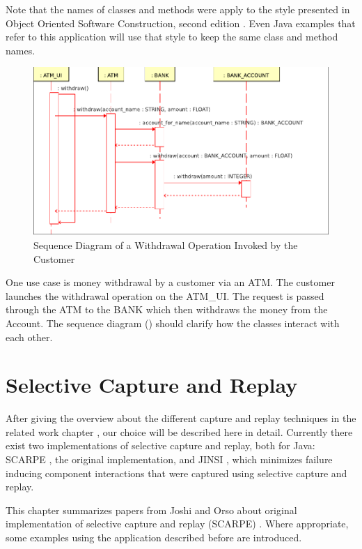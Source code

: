 Note that the names of classes and methods were apply to the style presented in Object Oriented Software Construction, second edition \cite{oosc2}. Even Java examples that refer to this application will use that style to keep the same class and method names.

\begin{figure}[ht]
   \centering
   \includegraphics[width=1\textwidth]{illustrations/example_withdrawal}
   \caption{Sequence Diagram of a Withdrawal Operation Invoked by the Customer}
   \label{fig:example_withdraw_sequence}
\end{figure}

One use case is money withdrawal by a customer via an ATM. The customer launches the withdrawal operation on the ATM\_UI. The request is passed through the ATM to the BANK which then withdraws the money from the Account. The sequence diagram () should clarify how the classes interact with each other.



\section{Selective Capture and Replay}
After giving the overview about the different capture and replay techniques in the related work chapter	, our choice will be described here in detail. Currently there exist two implementations of selective capture and replay, both for Java: SCARPE \cite{orso05may, orso06}, the original implementation, and JINSI \cite{JINSI}, which minimizes failure inducing component interactions that were captured using selective capture and replay.

This chapter summarizes papers from Joshi and Orso about original implementation of selective capture and replay (SCARPE) \cite{orso05may, orso06}. Where appropriate, some examples using the application described before are introduced.

